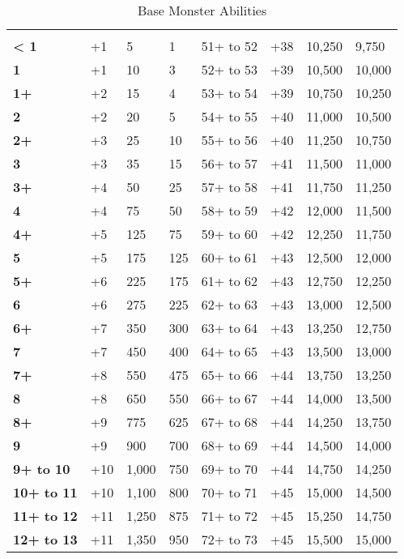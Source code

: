 \begin {table}[H]
  \caption{Base Monster Abilities}\label{tab:Base Monster Abilities}
  \begin{tabularx}{\columnwidth}{>{\bfseries}YYYYYYYY}
		 &  &  &  &  &  &  & \\
	< 1 & +1 & 5 & 1 & 51+ to 52 & +38 & 10,250 & 9,750\\
	1 & +1 & 10 & 3 & 52+ to 53 & +39 & 10,500 & 10,000\\
	1+ & +2 & 15 & 4 & 53+ to 54 & +39 & 10,750 & 10,250\\
	2 & +2 & 20 & 5 & 54+ to 55 & +40 & 11,000 & 10,500\\
	2+ & +3 & 25 & 10 & 55+ to 56 & +40 & 11,250 & 10,750\\
	3 & +3 & 35 & 15 & 56+ to 57 & +41 & 11,500 & 11,000\\
	3+ & +4 & 50 & 25 & 57+ to 58 & +41 & 11,750 & 11,250\\
	4 & +4 & 75 & 50 & 58+ to 59 & +42 & 12,000 & 11,500\\
	4+ & +5 & 125 & 75 & 59+ to 60 & +42 & 12,250 & 11,750\\
	5 & +5 & 175 & 125 & 60+ to 61 & +43 & 12,500 & 12,000\\
	5+ & +6 & 225 & 175 & 61+ to 62 & +43 & 12,750 & 12,250\\
	6 & +6 & 275 & 225 & 62+ to 63 & +43 & 13,000 & 12,500\\
	6+ & +7 & 350 & 300 & 63+ to 64 & +43 & 13,250 & 12,750\\
	7 & +7 & 450 & 400 & 64+ to 65 & +43 & 13,500 & 13,000\\
	7+ & +8 & 550 & 475 & 65+ to 66 & +44 & 13,750 & 13,250\\
	8 & +8 & 650 & 550 & 66+ to 67 & +44 & 14,000 & 13,500\\
	8+ & +9 & 775 & 625 & 67+ to 68 & +44 & 14,250 & 13,750\\
	9 & +9 & 900 & 700 & 68+ to 69 & +44 & 14,500 & 14,000\\
	9+ to 10 & +10 & 1,000 & 750 & 69+ to 70 & +44 & 14,750 & 14,250\\
	10+ to 11 & +10 & 1,100 & 800 & 70+ to 71 & +45 & 15,000 & 14,500\\
	11+ to 12 & +11 & 1,250 & 875 & 71+ to 72 & +45 & 15,250 & 14,750\\
	12+ to 13 & +11 & 1,350 & 950 & 72+ to 73 & +45 & 15,500 & 15,000\\

\end{tabularx}
\end{table}
